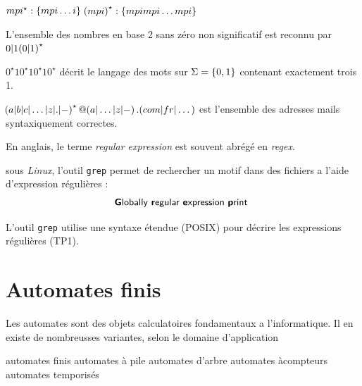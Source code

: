     \begin{example}{}{}
        \begin{enumerate}
            \itt $mpi^\star : \left\{mpi \dots i\right\}$
            \itt $\!\left(mpi\right)^\star : \left\{mpimpi \dots mpi\right\}$
            
            \itt L'ensemble des nombres en base 2 sans zéro non significatif est reconnu par
            $0 \vert 1 \!\left(0 \vert 1\right)^\star$
            
            \itt $0^\star 1 0^\star 1 0^\star 1 0^\star$ décrit le langage des mots sur $\Sigma = \left\{0, 1\right\}$ contenant exactement trois 1.
        
            \itt $\!\left(a \vert b \vert c \vert \dots \vert z \vert .\vert-\right)^\star @ \!\left(a \vert \dots \vert z \vert -\right).\!\left(com \vert fr \vert \dots\right)$
            est l'ensemble des adresses mails syntaxiquement correctes.
        \end{enumerate}
    \end{example}
    
    \begin{enumerate}
        \itt En anglais, le terme \textit{regular expression} est souvent abrégé en \textit{regex}.
        
        \itt sous \textit{Linux}, l'outil \texttt{grep} permet de rechercher un motif dans des fichiers a l'aide d'expression régulières :
        \[ \text{\sffamily\textbf Globally \textbf regular \textbf expression \textbf print }\]
        
        L'outil \texttt{grep} utilise une syntaxe étendue (\textsf{POSIX}) pour décrire les expressions régulières (\cf TP1).
        
    \end{enumerate}
    
    \section{Automates finis}
    
    Les automates sont des objets calculatoires fondamentaux a l'informatique.
    Il en existe de nombreusses variantes, selon le domaine d'application 
    \begin{enumerate}
        
        \itt automates finis 
        \itt automates à pile 
        \itt automates d'arbre 
        \itt automates àcompteurs 
        \itt automates temporisés 
        
    \end{enumerate}
    
